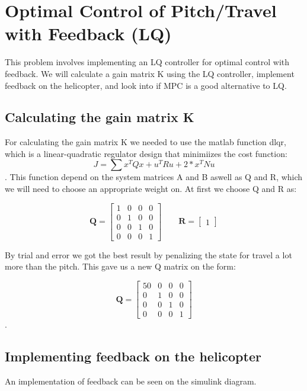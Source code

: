 \section{Optimal Control of Pitch/Travel with Feedback (LQ)}\label{sec:prob3}
This problem involves implementing an LQ controller for optimal control with feedback. We will calculate a gain matrix K using the LQ controller, implement feedback on the helicopter, and look into if MPC is a good alternative to LQ.

\subsection{Calculating the gain matrix K}
For calculating the gain matrix K we needed to use the matlab function dlqr, which is a linear-quadratic regulator design that minimiizes the cost function:
\begin{equation}
J = \sum {x^TQx + u^TRu + 2*x^TNu}
\end{equation}.
This function depend on the system matrices A and B aswell as Q and R, which we will need to choose an appropriate weight on. At first we choose Q and R as:

\begin{equation}
\mathbf{Q} =
\begin{bmatrix}
1 & 0 & 0 & 0 \\
0 & 1 & 0 & 0 \\
0 & 0 & 1 & 0 \\
0 & 0 & 0 & 1
\end{bmatrix}
\qquad\mathbf{R}=
\begin{bmatrix}
1
\end{bmatrix}
\end{equation}

 By trial and error we got the best result by penalizing the state for travel a lot more than the pitch. This gave us a new Q matrix on the form:

\begin{equation}
\mathbf{Q} =
\begin{bmatrix}
50 & 0 & 0 & 0 \\
0 & 1 & 0 & 0 \\
0 & 0 & 1 & 0 \\
0 & 0 & 0 & 1
\end{bmatrix}
\end{equation}.


\subsection{Implementing feedback on the helicopter}
An implementation of feedback can be seen on the simulink diagram.

